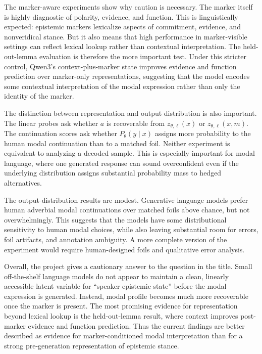 \documentclass{article}
\begin{document}
The marker-aware experiments show why caution is necessary. The marker itself is highly diagnostic of polarity, evidence, and function. This is linguistically expected: epistemic markers lexicalize aspects of commitment, evidence, and nonveridical stance. But it also means that high performance in marker-visible settings can reflect lexical lookup rather than contextual interpretation. The held-out-lemma evaluation is therefore the more important test. Under this stricter control, Qwen3's context-plus-marker state improves evidence and function prediction over marker-only representations, suggesting that the model encodes some contextual interpretation of the modal expression rather than only the identity of the marker.

The distinction between representation and output distribution is also important. The linear probes ask whether $a$ is recoverable from $z_{\theta,\ell}(x)$ or $z_{\theta,\ell}(x,m)$. The continuation scores ask whether $P_\theta(y\mid x)$ assigns more probability to the human modal continuation than to a matched foil. Neither experiment is equivalent to analyzing a decoded sample. This is especially important for modal language, where one generated response can sound overconfident even if the underlying distribution assigns substantial probability mass to hedged alternatives.

The output-distribution results are modest. Generative language models prefer human adverbial modal continuations over matched foils above chance, but not overwhelmingly. This suggests that the models have some distributional sensitivity to human modal choices, while also leaving substantial room for errors, foil artifacts, and annotation ambiguity. A more complete version of the experiment would require human-designed foils and qualitative error analysis.

Overall, the project gives a cautionary answer to the question in the title. Small off-the-shelf language models do not appear to maintain a clean, linearly accessible latent variable for ``speaker epistemic state'' before the modal expression is generated. Instead, modal profile becomes much more recoverable once the marker is present. The most promising evidence for representation beyond lexical lookup is the held-out-lemma result, where context improves post-marker evidence and function prediction. Thus the current findings are better described as evidence for marker-conditioned modal interpretation than for a strong pre-generation representation of epistemic stance.
\end{document}
